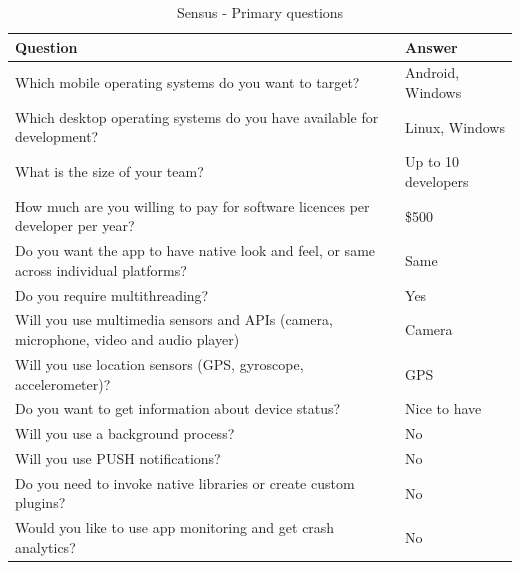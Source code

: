 \documentclass[english,master,public,dept460,male,cpdeclaration,oneside]{diploma}
\begin{document}
\begin{table}[!h]
	\centering
	\caption{Sensus - Primary questions}
	\begin{tabular}{p{7.5cm} | p{5cm}}
		\toprule		
		\textbf{Question} &	\textbf{Answer}\\
		\midrule
		Which mobile operating systems do you want to target? &	Android, Windows \\
		Which desktop operating systems do you have available for development? & Linux, Windows \\
		What is the size of your team? & Up to 10 developers \\
		How much are you willing to pay for software licences per developer per year? & \$500 \\
		Do you want the app to have native look and feel, or same across individual platforms? & Same \\
		Do you require multithreading? & Yes \\
		Will you use multimedia sensors and APIs (camera, microphone, video and audio player) & Camera  \\
		Will you use location sensors (GPS, gyroscope, accelerometer)? & GPS \\
		Do you want to get information about device status? & Nice to have \\
		Will you use a background process? & No \\
		Will you use PUSH notifications? & No \\
		Do you need to invoke native libraries or create custom plugins? & No \\
		Would you like to use app monitoring and get crash analytics? & No \\		
		\midrule
	\end{tabular}
\end{table}
\end{document}
